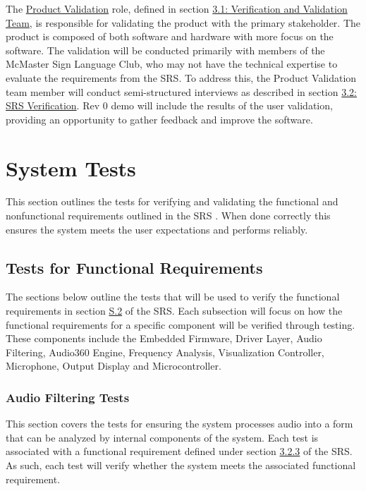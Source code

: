 \documentclass[12pt, titlepage]{article}
\begin{document}
The \hyperref[role:product_validation]{Product Validation} role, defined in
section \hyperref[sec:vnv_team]{3.1: Verification and Validation Team}, is
responsible for validating the product with the primary stakeholder. The
product is composed of both software and hardware with more focus on the
software. The validation will be conducted primarily with members of the
McMaster Sign Language Club, who may not have the technical expertise to
evaluate the requirements from the SRS. To address this, the Product Validation
team member will conduct semi-structured interviews as described in section
\hyperref[sec:srs_verification]{3.2: SRS Verification}. Rev 0 demo will include
the results of the user validation, providing an opportunity to gather feedback
and improve the software.

\section{System Tests} \label{sec:system_tests}

This section outlines the tests for verifying and validating the functional and 
nonfunctional requirements outlined in the SRS \citep{SRS}. When done correctly 
this ensures the system meets the user expectations and performs reliably. 

\subsection{Tests for Functional Requirements}

The sections below outline the tests that will be used to verify the functional 
requirements in section \hyperref[SRS-sec:S.2]{S.2} of the SRS. Each subsection 
will focus on how the functional requirements for a specific component will be 
verified through testing. These components include the Embedded Firmware, 
Driver Layer, Audio Filtering, Audio360 Engine, Frequency Analysis, 
Visualization Controller, Microphone, Output Display and Microcontroller. 

\subsubsection{Audio Filtering Tests}

This section covers the tests for ensuring the system processes audio into a 
form that can be analyzed by internal components of the system. Each test is 
associated with a functional requirement defined under section 
\hyperref[SRS-sec:FR3]{3.2.3} of the SRS. As such, each test will verify whether
 the system meets the associated functional requirement. 
\end{document}
